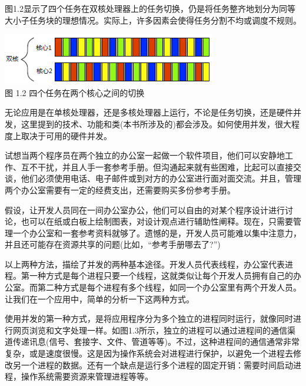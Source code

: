 图1.2显示了四个任务在双核处理器上的任务切换，仍是将任务整齐地划分为同等大小子任务块的理想情况。实际上，许多因素会使得任务分割不均或调度不规则。

\begin{center}
    \includegraphics[width=0.7\textwidth]{content/chapter01/images/1-2.png}\\
    图 1.2 四个任务在两个核心之间的切换
\end{center}

无论应用是在单核处理器，还是多核处理器上运行，不论是任务切换，还是硬件并发，这里提到的技术、功能和类(本书所涉及的)都会涉及。如何使用并发，很大程度上取决于可用的硬件并发。


试想当两个程序员在两个独立的办公室一起做一个软件项目，他们可以安静地工作、互不干扰，并且人手一套参考手册。但沟通起来就有些困难，比起可以直接交谈，他们必须使用电话、电子邮件或到对方的办公室进行面对面交流。并且，管理两个办公室需要有一定的经费支出，还需要购买多份参考手册。

假设，让开发人员同在一间办公室办公，他们可以自由的对某个程序设计进行讨论，也可以在纸或白板上绘制图表，对设计观点进行辅助性阐释。现在，只需要管理一个办公室和一套参考资料就够了。遗憾的是，开发人员可能难以集中注意力，并且还可能存在资源共享的问题(比如，“参考手册哪去了?”)

以上两种方法，描绘了并发的两种基本途径。开发人员代表线程，办公室代表进程。第一种方式是每个进程只要一个线程，这就类似让每个开发人员拥有自己的办公室。而第二种方式是每个进程有多个线程，如同一个办公室里有两个开发人员。让我们在一个应用中，简单的分析一下这两种方式。


使用并发的第一种方式，是将应用程序分为多个独立的进程同时运行，就像同时进行网页浏览和文字处理一样。如图1.3所示，独立的进程可以通过进程间的通信渠道传递讯息(信号、套接字、文件、管道等等)。不过，这种进程间的通信通常非常复杂，或是速度很慢。这是因为操作系统会对进程进行保护，以避免一个进程去修改另一个进程的数据。还有一个缺点是运行多个进程的固定开销：需要时间启动进程，操作系统需要资源来管理进程等等。

